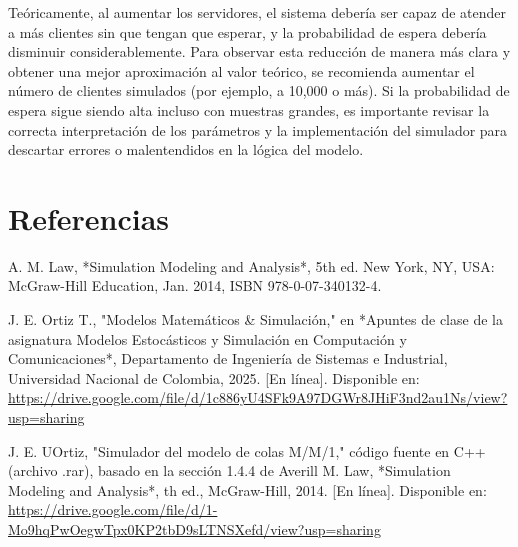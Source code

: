 \documentclass{article}
\begin{document}
Teóricamente, al aumentar los servidores, el sistema debería ser capaz de atender a más clientes sin que tengan que esperar, y la probabilidad de espera debería disminuir considerablemente. Para observar esta reducción de manera más clara y obtener una mejor aproximación al valor teórico, se recomienda aumentar el número de clientes simulados (por ejemplo, a 10,000 o más). Si la probabilidad de espera sigue siendo alta incluso con muestras grandes, es importante revisar la correcta interpretación de los parámetros y la implementación del simulador para descartar errores o malentendidos en la lógica del modelo.

\section{Referencias}
\renewcommand{\refname}{}
\begin{thebibliography}{9}

 \label{ref:modSim} A. M. Law, *Simulation Modeling and Analysis*, 5th ed. 
New York, NY, USA: McGraw-Hill Education, Jan. 2014, ISBN 978-0-07-340132-4. 

 \label{ref:matSim} J. E. Ortiz T., "Modelos Matemáticos \& Simulación,"
 en *Apuntes de clase de la asignatura Modelos Estocásticos y Simulación en 
 Computación y Comunicaciones*, Departamento de Ingeniería de Sistemas e Industrial, 
 Universidad Nacional de Colombia, 2025. [En línea]. Disponible en: 
 \url{https://drive.google.com/file/d/1c886yU4SFk9A97DGWr8JHiF3nd2au1Ns/view?usp=sharing}

  \label{ref:cimColas} J. E. UOrtiz, "Simulador del modelo de colas M/M/1," 
 código fuente en C++ (archivo .rar), basado en la sección 
 1.4.4 de Averill M. Law, *Simulation Modeling and Analysis*, 
 th ed., McGraw-Hill, 2014. [En línea]. Disponible en: 
 \url{https://drive.google.com/file/d/1-Mo9hqPwOegwTpx0KP2tbD9sLTNSXefd/view?usp=sharing}



\end{thebibliography}
\end{document}
